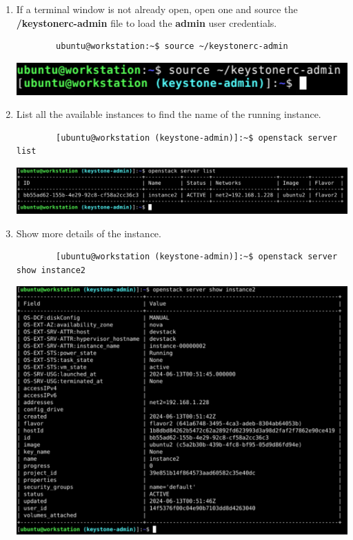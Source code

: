 \documentclass[letterpaper, 12pt]{article}
\begin{document}
\begin{enumerate}
    \item If a terminal window is not already open, open one and source the \textbf{\texttildemid/keystonerc-admin} file
    to load the \textbf{admin} user credentials.
    \begin{lstlisting}
        ubuntu@workstation:~$ source ~/keystonerc-admin        
    \end{lstlisting}

    \begin{center}
        \includegraphics[width=\linewidth]{images/part5/step1.png}
    \end{center}

    \item List all the available instances to find the name of the running instance.
    \begin{lstlisting}
        [ubuntu@workstation (keystone-admin)]:~$ openstack server list
    \end{lstlisting}

    \begin{center}
        \includegraphics[width=\linewidth]{images/part5/step2.png}
    \end{center}

    \item Show more details of the instance.
    \begin{lstlisting}
        [ubuntu@workstation (keystone-admin)]:~$ openstack server show instance2
    \end{lstlisting}

    \begin{center}
        \includegraphics[width=\linewidth]{images/part5/step3.png}
    \end{center}


\end{enumerate}
\end{document}
